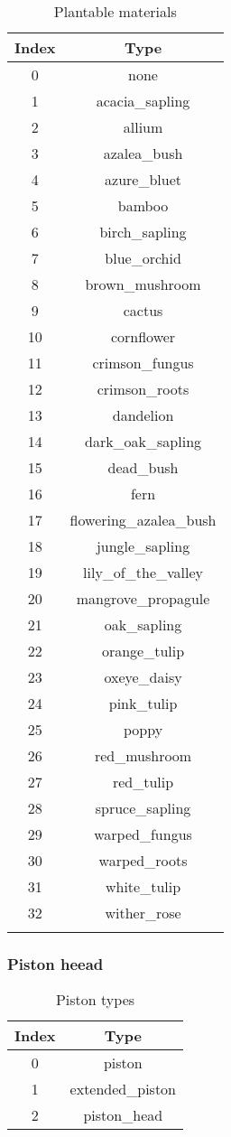 \begin{longtable}{ |c|c| }
	\hline
	Index & Type \\
	\hline
	\endhead
	0 & none \\
	1 & acacia\_sapling \\
	2 & allium \\
	3 & azalea\_bush \\
	4 & azure\_bluet \\
	5 & bamboo \\
	6 & birch\_sapling \\
	7 & blue\_orchid \\
	8 & brown\_mushroom \\
	9 & cactus \\
	10 & cornflower \\
	11 & crimson\_fungus \\
	12 & crimson\_roots \\
	13 & dandelion \\
	14 & dark\_oak\_sapling \\
	15 & dead\_bush \\
	16 & fern \\
	17 & flowering\_azalea\_bush \\
	18 & jungle\_sapling \\
	19 & lily\_of\_the\_valley \\
	20 & mangrove\_propagule \\
	21 & oak\_sapling \\
	22 & orange\_tulip \\
	23 & oxeye\_daisy \\
	24 & pink\_tulip \\
	25 & poppy \\
	26 & red\_mushroom \\
	27 & red\_tulip \\
	28 & spruce\_sapling \\
	29 & warped\_fungus \\
	30 & warped\_roots \\
	31 & white\_tulip \\
	32 & wither\_rose \\
	\hline
	\caption{Plantable materials}
\end{longtable}

\subsubsection{Piston heead}

\begin{table}[H]
\centering
\begin{tabular}{ |c|c| }
	\hline
	Index & Type \\
	\hline
	0 & piston \\
	1 & extended\_piston \\
	2 & piston\_head \\
	\hline
\end{tabular}
\caption{Piston types}
\end{table}

